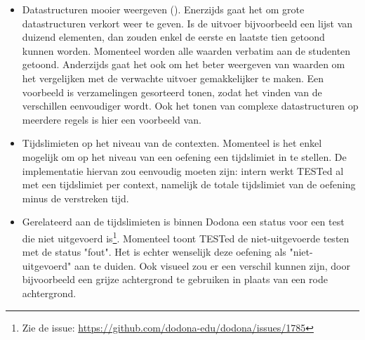 \begin{itemize}
    \item Datastructuren mooier weergeven ().
    Enerzijds gaat het om grote datastructuren verkort weer te geven.
    Is de uitvoer bijvoorbeeld een lijst van duizend elementen, dan zouden enkel de eerste en laatste tien getoond kunnen worden.
    Momenteel worden alle waarden verbatim aan de studenten getoond.
    Anderzijds gaat het ook om het beter weergeven van waarden om het vergelijken met de verwachte uitvoer gemakkelijker te maken.
    Een voorbeeld is verzamelingen gesorteerd tonen, zodat het vinden van de verschillen eenvoudiger wordt.
    Ook het tonen van complexe datastructuren op meerdere regels is hier een voorbeeld van.
    \item Tijdslimieten op het niveau van de contexten.
    Momenteel is het enkel mogelijk om op het niveau van een oefening een tijdslimiet in te stellen.
    De implementatie hiervan zou eenvoudig moeten zijn: intern werkt TESTed al met een tijdslimiet per context, namelijk de totale tijdslimiet van de oefening minus de verstreken tijd.
    \item Gerelateerd aan de tijdslimieten is binnen Dodona een status voor een test die niet uitgevoerd is\footnote{Zie de issue: \url{https://github.com/dodona-edu/dodona/issues/1785}}.
    Momenteel toont TESTed de niet-uitgevoerde testen met de status "fout".
    Het is echter wenselijk deze oefening als "niet-uitgevoerd" aan te duiden.
    Ook visueel zou er een verschil kunnen zijn, door bijvoorbeeld een grijze achtergrond te gebruiken in plaats van een rode achtergrond.
\end{itemize}